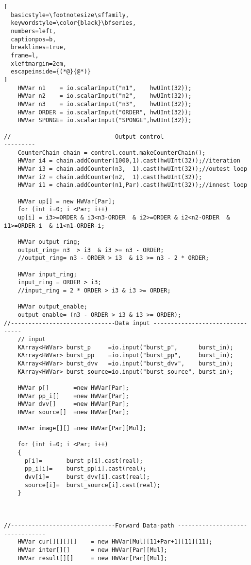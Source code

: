 \begin{lstlisting}[
  basicstyle=\footnotesize\sffamily,
  keywordstyle=\color{black}\bfseries,
  numbers=left,
  captionpos=b,
  breaklines=true,
  frame=l,
  xleftmargin=2em,
  escapeinside={(*@}{@*)}
]
    HWVar n1    = io.scalarInput("n1",    hwUInt(32));
    HWVar n2    = io.scalarInput("n2",    hwUInt(32));
    HWVar n3    = io.scalarInput("n3",    hwUInt(32));
    HWVar ORDER = io.scalarInput("ORDER", hwUInt(32));
    HWVar SPONGE= io.scalarInput("SPONGE",hwUInt(32));

//------------------------------Output control --------------------------------
    CounterChain chain = control.count.makeCounterChain();
    HWVar i4 = chain.addCounter(1000,1).cast(hwUInt(32));//iteration
    HWVar i3 = chain.addCounter(n3,  1).cast(hwUInt(32));//outest loop
    HWVar i2 = chain.addCounter(n2,  1).cast(hwUInt(32));
    HWVar i1 = chain.addCounter(n1,Par).cast(hwUInt(32));//innest loop

    HWVar up[] = new HWVar[Par];
    for (int i=0; i <Par; i++)
    up[i] = i3>=ORDER & i3<n3-ORDER  & i2>=ORDER & i2<n2-ORDER  & i1>=ORDER-i  & i1<n1-ORDER-i;

    HWVar output_ring;
    output_ring= n3  > i3  & i3 >= n3 - ORDER;
    //output_ring= n3 - ORDER > i3  & i3 >= n3 - 2 * ORDER;

    HWVar input_ring;
    input_ring = ORDER > i3;
    //input_ring = 2 * ORDER > i3 & i3 >= ORDER;

    HWVar output_enable;
    output_enable= (n3 - ORDER > i3 & i3 >= ORDER);
//------------------------------Data input --------------------------------
    // input
    KArray<HWVar> burst_p     =io.input("burst_p",      burst_in);
    KArray<HWVar> burst_pp    =io.input("burst_pp",     burst_in);
    KArray<HWVar> burst_dvv   =io.input("burst_dvv",    burst_in);
    KArray<HWVar> burst_source=io.input("burst_source", burst_in);

    HWVar p[]       =new HWVar[Par];
    HWVar pp_i[]    =new HWVar[Par];
    HWVar dvv[]     =new HWVar[Par];
    HWVar source[]  =new HWVar[Par];

    HWVar image[][] =new HWVar[Par][Mul];

    for (int i=0; i <Par; i++)
    {
      p[i]=       burst_p[i].cast(real);
      pp_i[i]=    burst_pp[i].cast(real);
      dvv[i]=     burst_dvv[i].cast(real);
      source[i]=  burst_source[i].cast(real);
    }



//------------------------------Forward Data-path --------------------------------
    HWVar cur[][][][]    = new HWVar[Mul][11+Par+1][11][11];
    HWVar inter[][]      = new HWVar[Par][Mul];
    HWVar result[][]     = new HWVar[Par][Mul];


\end{lstlisting}
